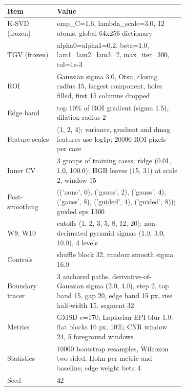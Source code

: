\begin{tabular}{lp{0.72\linewidth}}
\toprule
Item & Value \\
\midrule
K-SVD (frozen) & omp\_C=1.6, lambda\_scale=3.0, 12 atoms, global 64x256 dictionary \\
TGV (frozen) & alpha0=alpha1=0.2, beta=1.0, lam1=lam2=lam3=2, max\_iter=300, tol=1e-3 \\
ROI & Gaussian sigma 3.0, Otsu, closing radius 15, largest component, holes filled, first 15 columns dropped \\
Edge band & top 10\% of ROI gradient (sigma 1.5), dilation radius 2 \\
Feature scales & (1, 2, 4); variance, gradient and dmag features use log1p; 20000 ROI pixels per case \\
Inner CV & 3 groups of training cases; ridge (0.01, 1.0, 100.0); HGB leaves (15, 31) at scale 2, window 15 \\
Post-smoothing & (('none', 0), ('gauss', 2), ('gauss', 4), ('gauss', 8), ('guided', 4), ('guided', 8)); guided eps 1300 \\
W9, W10 & cutoffs (1, 2, 3, 5, 8, 12, 20); non-decimated pyramid sigmas (1.0, 3.0, 10.0), 4 levels \\
Controls & shuffle block 32, random smooth sigma 16.0 \\
Boundary tracer & 3 anchored paths, derivative-of-Gaussian sigma (2.0, 4.0), step 2, top band 15, gap 20, edge band 15 px, rise half-width 15, segment 32 \\
Metrics & GMSD c=170; Laplacian EPI blur 1.0; flat blocks 16 px, 10\%; CNR window 24, 5 foreground windows \\
Statistics & 10000 bootstrap resamples, Wilcoxon two-sided, Holm per metric and baseline; edge weight beta 4 \\
Seed & 42 \\
\bottomrule
\end{tabular}
